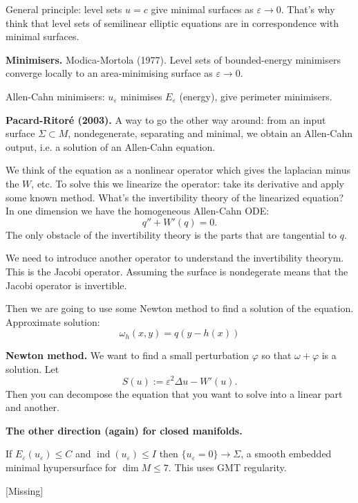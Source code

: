 General principle: level sets $u=c$ give
minimal surfaces as $\varepsilon \to 0$.
That's why think that
level sets of semilinear
elliptic equations are in correspondence
with minimal surfaces.

\medskip\noindent
{\bf Minimisers.} Modica-Mortola (1977).
Level sets of bounded-energy minimisers
converge locally to an area-minimising
surface
as $\varepsilon \to 0$.

Allen-Cahn minimisers:
$u_\varepsilon$ minimises $E_\varepsilon$
(energy), give perimeter minimisers.

\medskip\noindent
{\bf Pacard-Ritoré (2003).} 
A way to go the other way around:
from an input surface $\Sigma \subset M$,
nondegenerate, separating and minimal,
we obtain an Allen-Cahn output, i.e.
a solution of an Allen-Cahn equation.

We think of the equation as a nonlinear
operator which gives the laplacian minus 
the $W$, etc. To solve this we linearize
the operator: take its derivative and 
apply some known method.
What's the invertibility theory
of the linearized equation?
In one dimension we have the homogeneous
Allen-Cahn ODE:
$$
q''+W'(q)=0.
$$
The only obstacle of the invertibility
theory is the parts that are tangential to
$q$.

We need to introduce another operator
to understand the invertibility theorym.
This is the Jacobi operator.
Assuming the surface is nondegerate
means that the Jacobi operator is invertible.

Then we are going to use some Newton method
to find a solution of the equation.
Approximate solution:
$$
\omega_h(x,y)
=
q(y-h(x))
$$

 \medskip\noindent
{\bf Newton method.} We want to find
a small perturbation $\varphi$ so that
$\omega+\varphi$ is a solution.
Let 
$$
S(u):= \varepsilon^2 \Delta u-W'(u).
$$
Then you can decompose the equation
that you want to solve into
a linear part and another.

\medskip\noindent
{\bf The other direction (again) 
for closed manifolds.}

\begin{theorem}
\label{theorem-finite-index-convergence}
If $E_\varepsilon(u_\varepsilon)\leq  C$
and $\operatorname{ind}(u_\varepsilon) \leq
I$ then $\{u_\varepsilon=0\} \to \Sigma$,
a smooth embedded minimal hyupersurface for
$\dim M \leq  7$. This uses GMT regularity.
\end{theorem}

\begin{theorem}
\label{theorem-minmax-weyl}
[Missing]
\end{theorem}

